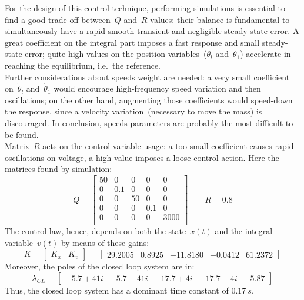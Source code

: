 For the design of this control technique, performing simulations is essential to find a good trade-off between~$Q$ and~$R$ values: their balance is fundamental to simultaneously have a rapid smooth transient and negligible steady-state error. A great coefficient on the integral part imposes a fast response and small steady-state error; quite high values on the position variables~($\theta_l$ and~$\theta_1$) accelerate in reaching the equilibrium, i.e.\ the reference. \\ Further considerations about speeds weight are needed: a very small coefficient on~$\dot \theta_l$ and~$\dot \theta_1$ would encourage high-frequency speed variation and then oscillations; on the other hand, augmenting those coefficients would speed-down the response, since a velocity variation~(necessary to move the mass) is discouraged. In conclusion, speeds parameters are probably the most difficult to be found. \\ Matrix~$R$ acts on the control variable usage: a too small coefficient causes rapid oscillations on voltage, a high value imposes a loose control action.
Here the matrices found by simulation:
\[
	Q =
	\begin{bmatrix}
		50 & 0 & 0 & 0 & 0 \\
		0 & 0.1 & 0 & 0 & 0 \\
		0 & 0 & 50 & 0 & 0 \\
		0 & 0 & 0 & 0.1 & 0 \\
		0 & 0 & 0 & 0 & 3000 \\
	\end{bmatrix}
	\qquad
	R = 0.8
\]
The control law, hence, depends on both the state~$x(t)$ and the integral variable~$v(t)$ by means of these gains:
\begin{equation}
	K =
	\left[
	\begin{array}{c|c}
		K_x & K_v
	\end{array}
	\right]
	=
	\left[
	\begin{array}{cccc|c}
		29.2005 & 0.8925 & -11.8180 & -0.0412 & 61.2372
	\end{array}
	\right]
	\label{eq:1dof_LQ_fastK}
\end{equation}
Moreover, the poles of the closed loop system are in:
\begin{equation}
	\lambda_{CL} =
	\begin{bmatrix}
		-5.7+41i & -5.7-41i & -17.7+4i & -17.7-4i & -5.87 
	\end{bmatrix}
\end{equation}
Thus, the closed loop system has a dominant time constant of $0.17\ s$. \\
